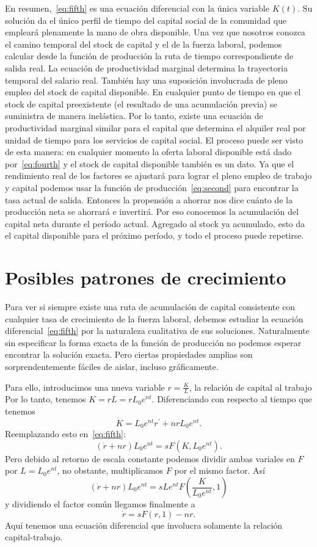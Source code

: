 En resumen,~\eqref{eq:fifth} es una ecuación diferencial con la única variable $K\left(t\right)$. Su solución da el único perfil de tiempo del capital social de la comunidad que empleará plenamente la mano de obra disponible. Una vez que nosotros conozca el camino temporal del stock de capital y el de la fuerza laboral, podemos calcular desde la función de producción la ruta de tiempo correspondiente de salida real. La ecuación de productividad marginal determina la trayectoria temporal del salario real. También hay una suposición involucrada de pleno empleo del stock de capital disponible. En cualquier punto de tiempo en que el stock de capital preexistente (el resultado de una acumulación previa) se suministra de manera inelástica. Por lo tanto, existe una ecuación de productividad marginal similar para el capital que determina el alquiler real por unidad de tiempo para los servicios de capital social. El proceso puede ser visto de esta manera: en cualquier momento la oferta laboral disponible está dado por~\eqref{eq:fourth} y el stock de capital disponible también es un dato. Ya que el rendimiento real de los factores se ajustará para lograr el pleno empleo de trabajo y capital podemos usar la función de producción~\eqref{eq:second} para encontrar la tasa actual de salida. Entonces la propensión a ahorrar nos dice cuánto de la producción neta se ahorrará e invertirá. Por eso conocemos la acumulación del capital neta durante el período actual. Agregado al stock ya acumulado, esto da el capital disponible para el próximo período, y todo el proceso puede repetirse.
\section{Posibles patrones de crecimiento}
Para ver si siempre existe una ruta de acumulación de capital consistente con cualquier tasa de crecimiento de la fuerza laboral, debemos estudiar la ecuación diferencial~\eqref{eq:fifth} por la naturaleza cualitativa de sus soluciones. Naturalmente sin especificar la forma exacta de la función de producción no podemos esperar encontrar la solución exacta. Pero ciertas propiedades amplias son sorprendentemente fáciles de aislar, incluso gráficamente.

Para ello, introducimos una nueva variable $r=\frac{K}{L}$, la relación de capital al trabajo Por lo tanto, tenemos $K=rL=rL_{0}e^{nt}$. Diferenciando con respecto al tiempo que tenemos
\begin{equation}
\dot{K}=L_{0}e^{nt}r^{\prime}+nrL_{0}e^{nt}.
\end{equation}
Reemplazando esto en~\eqref{eq:fifth}: \[ \left(\dot{r}+nr\right)L_{0}e^{nt}=sF\left(K,L_{0}e^{nt}\right). \] Pero debido al retorno de escala constante podemos dividir ambas variales en $F$ por $L=L_{0}e^{nt}$, no obstante, multiplicamos $F$ por el mismo factor. Así \[ \left(\dot{r}+nr\right)L_{0}e^{nt}=sLe^{nt}F\left(\frac{K}{L_{0}e^{nt}},1\right) \] y dividiendo el factor común llegamos finalmente a
\begin{equation}\label{eq:sixth}
\dot{r}=sF\left(r,1\right)-nr.
\end{equation}
Aquí tenemos una ecuación diferencial que involucra solamente la relación capital-trabajo.

